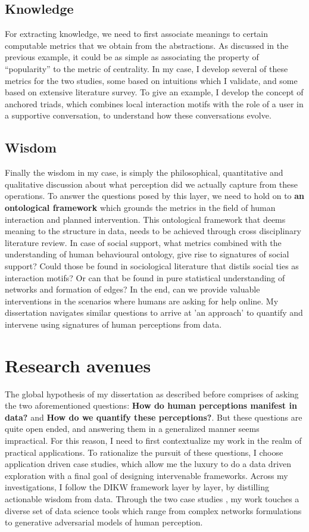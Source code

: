 \subsection{Knowledge}
For extracting knowledge, we need to first associate meanings to certain computable metrics that we obtain from the abstractions. As discussed in the previous example, it could be as simple as associating the property of ``popularity'' to the metric of centrality. In my case, I develop several of these metrics for the two studies, some based on intuitions which I validate, and some based on extensive literature survey. To give an example, I develop the concept of anchored triads, which combines local interaction motifs with the role of a user in a supportive conversation, to understand how these conversations evolve. 

\subsection{Wisdom}
Finally the wisdom in my case, is simply the philosophical, quantitative and qualitative discussion about what perception did we actually capture from these operations. To answer the questions posed by this layer, we need to hold on to \textbf{an ontological framework} which grounds the metrics in the field of human interaction and planned intervention. This ontological framework that deems meaning to the structure in data, needs to be achieved through cross disciplinary literature review. In case of social support, what metrics combined with the understanding of human behavioural ontology, give rise to signatures of social support? Could those be found in sociological literature that distils social ties as interaction motifs? Or can that be found in pure statistical understanding of networks and formation of edges?  In the end, can we provide valuable interventions in the scenarios where humans are asking for help online. My dissertation navigates similar questions to arrive at 'an approach' to quantify and intervene using signatures of human perceptions from data.

\section{Research avenues}
The global hypothesis of my dissertation as described before comprises of asking the two aforementioned questions: \textbf{How do human perceptions manifest in data?} and \textbf{How do we quantify these perceptions?}. But these questions are quite open ended, and answering them in a generalized manner seems impractical. For this reason, I need to first contextualize my work in the realm  of practical applications. 
To rationalize the pursuit of these questions, I choose application driven case studies, which allow me the luxury to do a data driven exploration with a final goal of designing intervenable frameworks.
Across my investigations, I follow the DIKW framework layer by layer, by distilling actionable wisdom from data. Through the two case studies , my work touches a diverse set of data science tools  which range from complex networks formulations to generative adversarial models of human perception.

